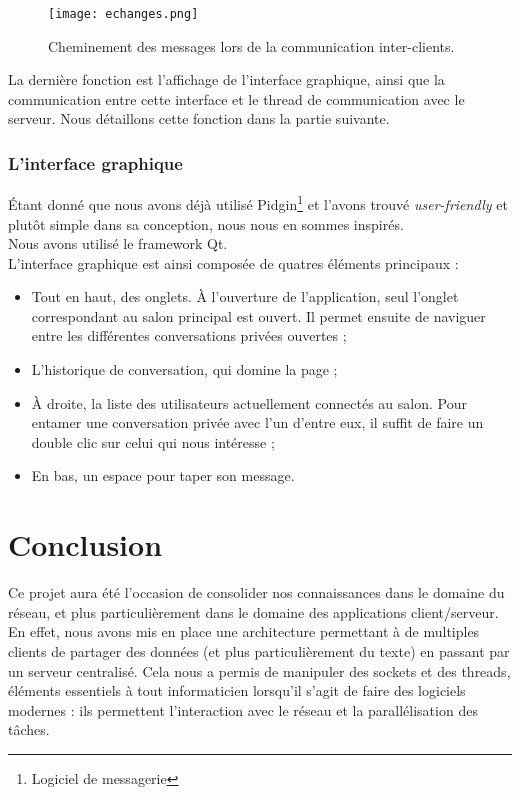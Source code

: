 			\begin{figure}[h!]
				\centering
				\texttt{[image: echanges.png]}
				\caption{Cheminement des messages lors de la communication inter-clients.}
			\end{figure}
			\FloatBarrier
		
			La dernière fonction est l'affichage de l'interface graphique, ainsi que la communication entre cette interface et le thread de communication avec le serveur. Nous détaillons cette fonction dans la partie suivante.
	
		\newpage
		\subsection{L'interface graphique}
			Étant donné que nous avons déjà utilisé Pidgin\footnote{Logiciel de messagerie} et l'avons trouvé \emph{user-friendly} et plutôt simple dans sa conception, nous nous en sommes inspirés.\\
			
			Nous avons utilisé le framework Qt.\\
			
			L'interface graphique est ainsi composée de quatres éléments principaux :
			\begin{itemize}
				\item Tout en haut, des onglets. À l'ouverture de l'application, seul l'onglet correspondant au salon principal est ouvert. Il permet ensuite de naviguer entre les différentes conversations privées ouvertes ;
				\item L'historique de conversation, qui domine la page ;
				\item À droite, la liste des utilisateurs actuellement connectés au salon. Pour entamer une conversation privée avec l'un d'entre eux, il suffit de faire un double clic sur celui qui nous intéresse ;
				\item En bas, un espace pour taper son message.
			\end{itemize}
			
			
			

\chapter*{Conclusion}
	Ce projet aura été l'occasion de consolider nos connaissances dans le domaine du réseau, et plus particulièrement dans le domaine des applications client/serveur. En effet, nous avons mis en place une architecture permettant à de multiples clients de partager des données (et plus particulièrement du texte) en passant par un serveur centralisé. Cela nous a permis de manipuler des sockets et des threads, éléments essentiels à tout informaticien lorsqu'il s'agit de faire des logiciels modernes : ils permettent l'interaction avec le réseau et la parallélisation des tâches.
	

